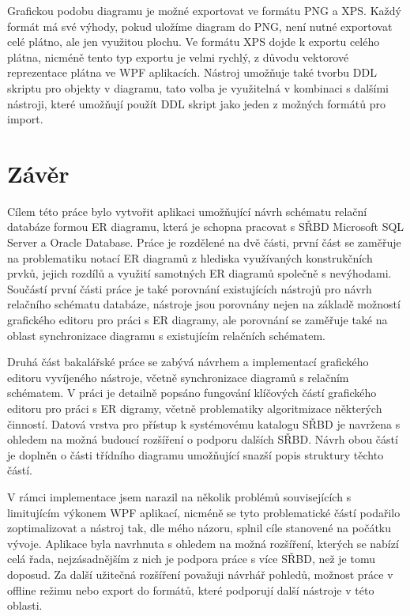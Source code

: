 \documentclass[czech,bachelor,public,dept460,male,oneside]{diploma}
\begin{document}
	Grafickou podobu diagramu je možné exportovat ve formátu PNG a XPS. Každý formát má své výhody, pokud uložíme diagram do PNG, není nutné exportovat celé plátno, ale jen využitou plochu. Ve formátu XPS dojde k exportu celého plátna, nicméně tento typ exportu je velmi rychlý, z důvodu vektorové reprezentace plátna ve WPF aplikacích. Nástroj umožňuje také tvorbu DDL skriptu pro objekty v diagramu, tato volba je využitelná v kombinaci s dalšími nástroji, které umožňují použít DDL skript jako jeden z možných formátů pro import.

\newpage
\section{Závěr}
Cílem této práce bylo vytvořit aplikaci umožňující návrh schématu relační databáze formou ER diagramu, která je schopna pracovat s SŘBD Microsoft SQL Server a Oracle Database. Práce je rozdělené na dvě části, první část se zaměřuje na problematiku notací ER diagramů z hlediska využívaných konstrukčních prvků, jejich rozdílů a využití samotných ER diagramů společně s nevýhodami. Součástí první části práce je také porovnání existujících nástrojů pro návrh relačního schématu databáze, nástroje jsou porovnány nejen na základě možností grafického editoru pro práci s ER diagramy, ale porovnání se zaměřuje také na oblast synchronizace diagramu s existujícím relačních schématem.

Druhá část bakalářské práce se zabývá návrhem a implementací grafického editoru vyvíjeného nástroje, včetně synchronizace diagramů s relačním schématem. V práci je detailně popsáno fungování klíčových částí grafického editoru pro práci s ER digramy, včetně problematiky algoritmizace některých činností. Datová vrstva pro přístup k systémovému katalogu SŘBD je navržena s ohledem na možná budoucí rozšíření o podporu dalších SŘBD. Návrh obou částí je doplněn o části třídního diagramu umožňující snazší popis struktury těchto částí.

V rámci implementace jsem narazil na několik problémů souvisejících s limitujícím výkonem WPF aplikací, nicméně se tyto problematické částí podařilo zoptimalizovat a nástroj tak, dle mého názoru, splnil cíle stanovené na počátku vývoje. Aplikace byla navrhnuta s ohledem na možná rozšíření, kterých se nabízí celá řada, nejzásadnějším z nich je podpora práce s více SŘBD, než je tomu doposud. Za další užitečná rozšíření považuji návrhář pohledů, možnost práce v offline režimu nebo export do formátů, které podporují další nástroje v této oblasti.
\end{document}
